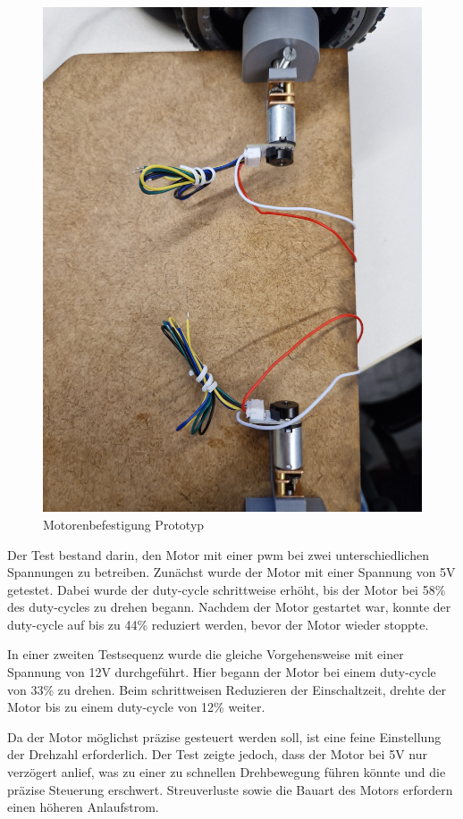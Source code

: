 \begin{figure}[H]
    \centering
    \includegraphics[width=0.8\linewidth]{img/Motorenaufbau.jpg}
    \caption{Motorenbefestigung Prototyp}
    \label{fig:Motorenaufbau}
\end{figure}

Der Test bestand darin, den Motor mit einer \acrfull{pwm} bei zwei unterschiedlichen Spannungen zu betreiben. Zunächst wurde der Motor mit einer Spannung von 5V getestet. Dabei wurde der \gls{duty-cycle} schrittweise erhöht, bis der Motor bei 58\% des \gls{duty-cycle}s zu drehen begann. Nachdem der Motor gestartet war, konnte der \gls{duty-cycle} auf bis zu 44\% reduziert werden, bevor der Motor wieder stoppte.

In einer zweiten Testsequenz wurde die gleiche Vorgehensweise mit einer Spannung von 12V durchgeführt. Hier begann der Motor bei einem \gls{duty-cycle} von 33\% zu drehen. Beim schrittweisen Reduzieren der Einschaltzeit, drehte der Motor bis zu einem \gls{duty-cycle} von 12\% weiter.

Da der Motor möglichst präzise gesteuert werden soll, ist eine feine Einstellung der Drehzahl erforderlich. Der Test zeigte jedoch, dass der Motor bei 5V nur verzögert anlief, was zu einer zu schnellen Drehbewegung führen könnte und die präzise Steuerung erschwert. Streuverluste sowie die Bauart des Motors erfordern einen höheren Anlaufstrom.


